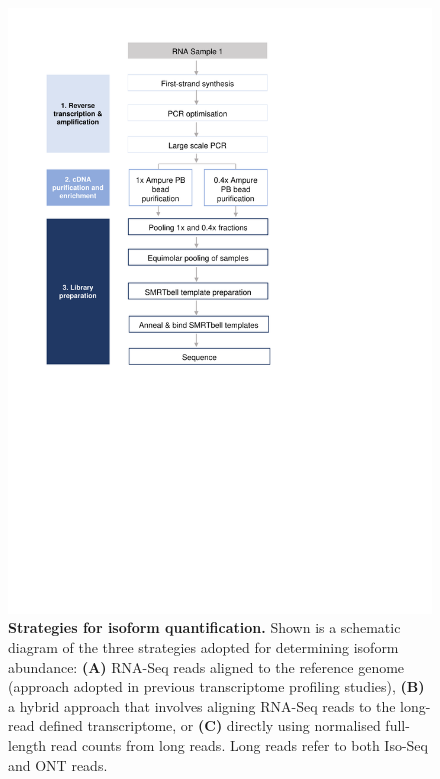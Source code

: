 \begin{figure}[htp]
	\begin{center}
		\includegraphics[page=8,trim={2cm 19cm 2cm 1cm},clip, scale = 0.8]{Figures/ProjectDevelopment_Figures.pdf}
	\end{center}
	\captionsetup{width=0.95\textwidth}
	\caption[Strategies for isoform quantification]%
	{\textbf{Strategies for isoform quantification.} Shown is a schematic diagram of the three strategies adopted for determining isoform abundance: \textbf{(A)} RNA-Seq reads aligned to the reference genome (approach adopted in previous transcriptome profiling studies), \textbf{(B)} a hybrid approach that involves aligning RNA-Seq reads to the long-read defined transcriptome, or \textbf{(C)} directly using normalised full-length read counts from long reads. Long reads refer to both Iso-Seq and ONT reads.}
	\label{fig:isoform_quant_strategy}
\end{figure}


